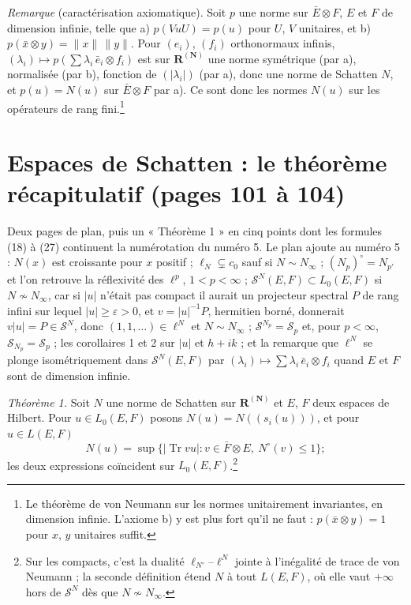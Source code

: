 \documentclass[11pt,a4paper]{article}
\begin{document}
\emph{Remarque} (caractérisation axiomatique). Soit $p$ une norme sur
$\bar{E} \otimes F$, $E$ et $F$ de dimension infinie, telle que a) $p(VuU) =
p(u)$ pour $U$, $V$ unitaires, et b) $p(\bar{x} \otimes y) = \|x\|\,\|y\|$.
Pour $(e_i)$, $(f_i)$ orthonormaux infinis, $(\lambda_i) \mapsto p(\sum
\lambda_i\,\bar{e}_i \otimes f_i)$ est sur $\mathbf{R}^{(\mathbf{N})}$ une
norme symétrique (par a), normalisée (par b), fonction de $(|\lambda_i|)$
(par a), donc une norme de Schatten $N$, et $p(u) = N(u)$ sur $\bar{E}
\otimes F$ par a). Ce sont donc les normes $N(u)$ sur les opérateurs de rang
fini.\footnote{Le théorème de von Neumann sur les normes unitairement
invariantes, en dimension infinie. L'axiome b) y est plus fort qu'il ne
faut : $p(\bar{x} \otimes y) = 1$ pour $x$, $y$ unitaires suffit.}

\section*{Espaces de Schatten : le théorème récapitulatif (pages 101 à 104)}

Deux pages de plan, puis un « Théorème 1 » en cinq points dont les formules
(18) à (27) continuent la numérotation du numéro 5. Le plan ajoute au
numéro 5 : $N(x)$ est croissante pour $x$ positif ; $\ell_N \subsetneq c_0$
sauf si $N \sim N_\infty$ ; $(N_p)^{\circ} = N_{p'}$ et l'on retrouve la
réflexivité des $\ell^p$, $1 < p < \infty$ ; $\mathcal{S}^N(E,F) \subset
L_0(E,F)$ si $N \not\sim N_\infty$, car si $|u|$ n'était pas compact il aurait
un projecteur spectral $P$ de rang infini sur lequel $|u| \geq \varepsilon
> 0$, et $v = |u|^{-1}P$, hermitien borné, donnerait $v|u| = P \in
\mathcal{S}^N$, donc $(1, 1, \ldots) \in \ell^N$ et
$N \sim N_\infty$ ; $\mathcal{S}^{N_p} = \mathcal{S}_p$ et, pour $p < \infty$,
$\mathcal{S}_{N_p} = \mathcal{S}_p$ ; les corollaires 1 et 2 sur $|u|$ et
$h + ik$ ; et la remarque que $\ell^N$ se plonge isométriquement dans
$\mathcal{S}^N(E,F)$ par $(\lambda_i) \mapsto \sum \lambda_i\,\bar{e}_i
\otimes f_i$ quand $E$ et $F$ sont de dimension infinie.

\emph{Théorème 1.} Soit $N$ une norme de Schatten sur $\mathbf{R}^{(\mathbf{N})}$
et $E$, $F$ deux espaces de Hilbert. Pour $u \in L_0(E,F)$ posons $N(u) =
N((s_i(u)))$, et pour $u \in L(E,F)$
\[
  N(u) = \sup\bigl\{ |\operatorname{Tr} vu| : v \in \bar{F} \otimes E,\ N^{\circ}(v)
  \leq 1 \bigr\} ;
\]
les deux expressions coïncident sur $L_0(E,F)$.\footnote{Sur les compacts,
c'est la dualité $\ell_{N^{\circ}}$--$\ell^{N}$ jointe à l'inégalité de trace
de von Neumann ; la seconde définition étend $N$ à tout $L(E,F)$, où elle
vaut $+\infty$ hors de $\mathcal{S}^N$ dès que $N \not\sim N_\infty$.}
\end{document}
